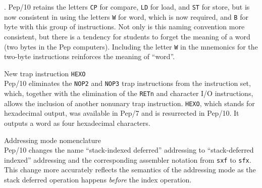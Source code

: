 \documentclass[10pt,fleqn]{book}
\newenvironment{exercises}
   {\begin{list}
      {\arabic{ecounter}.}
      {
         \usecounter{ecounter}
         \setcounter {ecounter}{0}
         \setlength\leftmargin{2pc}
         \setlength\labelwidth{6pc}
         \setlength\labelsep{1pc}
      }}
   {\end{list}}
\newcounter{ecounter}
\begin{document}
\begin{exercises}
Pep/10 retains the letters \verb|CP| for compare, \verb|LD| for load, and \verb|ST| for store, but is now consistent in using the letters \verb|W| for word, which is now required, and \verb|B| for byte with this group of instructions.
Not only is this naming convention more consistent, but there is a tendency for students to forget the meaning of a word (two bytes in the Pep computers).
Including the letter \verb|W| in the mnemonics for the two-byte instructions reinforces the meaning of ``word''.

\item New trap instruction \verb|HEXO|\\[6pt]
Pep/10 eliminates the \verb|NOP2| and \verb|NOP3| trap instructions from the instruction set, which, together with the elimination of the \verb|RETn| and character I/O instructions, allows the inclusion of another nonunary trap instruction.
\verb|HEXO|, which stands for hexadecimal output, was available in Pep/7 and is resurrected in Pep/10.
It outputs a word as four hexadecimal characters.

\item Addressing mode nomenclature\\[6pt]
Pep/10 changes the name ``stack-indexed deferred'' addressing to ``stack-deferred indexed'' addressing and the corresponding assembler notation from \verb|sxf| to \verb|sfx|.
This change more accurately reflects the semantics of the addressing mode as the stack deferred operation happens \textit{before} the index operation.

\end{exercises}

\newpage

\end{document}
